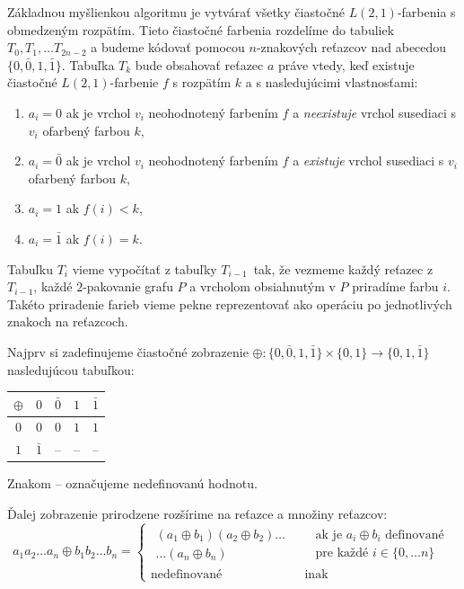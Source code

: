 Základnou myšlienkou algoritmu je vytvárať všetky čiastočné $L(2,1)$-farbenia s obmedzeným rozpätím.
Tieto čiastočné farbenia rozdelíme do tabuliek $T_0, T_1, \ldots T_{2n-2}$ a budeme kódovať pomocou
$n$-znakových reťazcov nad abecedou $\{0, \bar{0}, 1, \bar{1}\}$. Tabuľka $T_k$ bude obsahovať
reťazec $a$ práve vtedy, keď existuje čiastočné $L(2,1)$-farbenie $f$ s rozpätím $k$ a s nasledujúcimi vlastnosťami:

\begin{enumerate}
    \item $a_i = 0$ ak je vrchol $v_i$ neohodnotený farbením $f$ a \emph{neexistuje} vrchol susediaci s $v_i$ ofarbený farbou $k$,
    \item $a_i = \bar{0}$ ak je vrchol $v_i$ neohodnotený farbením $f$ a \emph{existuje} vrchol susediaci s $v_i$ ofarbený farbou $k$,
    \item $a_i = 1$ ak $f(i) < k$,
    \item $a_i = \bar{1}$ ak $f(i) = k$.
\end{enumerate}

Tabuľku $T_i$ vieme vypočítať z tabuľky $T_{i-1}$ tak, že vezmeme každý reťazec z $T_{i-1}$, každé
$2$-pakovanie grafu $P$ a vrcholom obsiahnutým v $P$ priradíme farbu $i$. Takéto priradenie farieb
vieme pekne reprezentovať ako operáciu po jednotlivých znakoch na reťazcoch.

Najprv si zadefinujeme čiastočné zobrazenie $\oplus : \{ 0, \bar{0}, 1, \bar{1}\} \times \{ 0, 1 \} \rightarrow \{0, 1, \bar{1}\}$
nasledujúcou tabuľkou:

\begin{tabular}{c | c c c c}
    $\oplus$ & $0$ & $\bar{0}$ & $1$ & $\bar{1}$ \\
    \hline
    $0$ & $0$ & $0$ & $1$ & $1$ \\
    $1$ & $\bar{1}$ & -- & -- & -- \\
\end{tabular}

Znakom -- označujeme nedefinovanú hodnotu.

Ďalej zobrazenie prirodzene rozšírime na reťazce a množiny reťazcov:
\begin{equation}
    a_1 a_2 \ldots a_n \oplus b_1 b_2 \ldots b_n =
      \begin{cases}
          \begin{gathered}
            (a_1 \oplus b_1)(a_2 \oplus b_2) \ldots \\
            \ldots (a_n \oplus b_n)  
          \end{gathered} &
          \begin{aligned}
            & \textrm{ak je } a_i \oplus b_i \textrm{ definované} \\ 
            & \textrm{pre každé } i \in \{0, \ldots n\} 
          \end{aligned} \\
        \textrm{nedefinované} & \textrm{ inak}
      \end{cases}
\end{equation}

